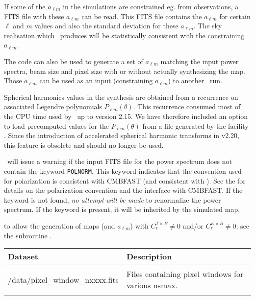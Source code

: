 \begin{codedescription}
{If some of the $a_{\ell m}$ in the simulations are constrained eg. from observations, a FITS file
with these $a_{\ell m}$ can be read. This FITS file contains 
the $a_{\ell m}$ for certain $\ell$ and $m$ values
and also the standard deviation for these $a_{\ell m}$. The sky
realisation which \thedocid\ produces will be statistically consistent
with the constraining $a_{\ell m}$.

The code can also be used
to generate a set of $a_{\ell m}$ matching the input power spectra, beam size and
pixel size with or without actually synthesizing the map. Those $a_{\ell m}$ can be
used as an input (constraining $a_{\ell m}$) to another \thedocid\ run.
}
\end{codedescription}
%
\begin{cd_contd}
{%
Spherical harmonics values in the synthesis are obtained from a
recurrence on associated Legendre polynomials $P_{\ell m}(\theta)$. 
This recurrence consumed most of the CPU time used by \thedocid\ up to version
2.15. We have therefore included an option to load precomputed values for the
$P_{\ell m}(\theta)$ from a file generated by the \healpix facility
. Since the introduction of accelerated spherical
harmonic transforms in \healpix v2.20, this feature is obsolete and should no
longer be used. 

\thedocid\ will issue a warning if the input FITS file for the power spectrum does
not contain the keyword {\tt POLNORM}. This keyword indicates that the convention
used for polarization is consistent with CMBFAST (and consistent with ). See the 
for details on the
polarization convention and the interface with CMBFAST. If the
keyword is not found, {\em no attempt will be made} to renormalize the power
spectrum. 
If the keyword is present, it will be inherited by the simulated map.

 to allow the generation of maps (and $a_{\ell m}$) with $C^{T\times B}_{\ell} \ne 0$ and/or $C^{E\times B}_{\ell} \ne 0$,
see the subroutine .
}
\end{cd_contd}


\begin{datasets}
{
\begin{tabular}{p{0.3\hsize} p{0.35\hsize}} \hline  
  \textbf{Dataset} & \textbf{Description} \\ \hline
                   &                      \\ %
  /data/pixel\_window\_nxxxx.fits & Files containing pixel windows for
                   various nsmax.\\ 
                   &                      \\ \hline %
\end{tabular}
} 
\end{datasets}

